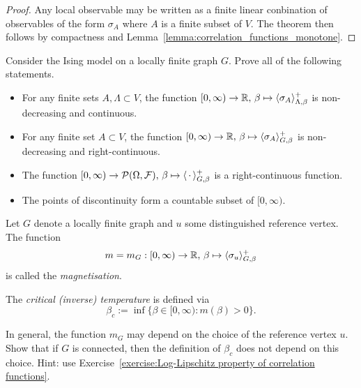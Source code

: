 \begin{proof}
    Any local observable may be written as a finite linear conbination
    of observables of the form $\sigma_A$ where $A$ is a finite subset of
    $V$.
    The theorem then follows by compactness and Lemma~\ref{lemma:correlation_functions_monotone}.
\end{proof}

\begin{exercise}
    Consider the Ising model on a locally finite graph $G$.
    Prove all of the following statements.
    \begin{itemize}
        \item For any finite sets $A,\Lambda\subset V$,
        the function $[0,\infty)\to\mathbb R,\,\beta\mapsto\langle\sigma_A\rangle_{\Lambda,\beta}^+$
        is non-decreasing and continuous.
        \item For any finite set $A\subset V$,
        the function $[0,\infty)\to\mathbb R,\,\beta\mapsto\langle\sigma_A\rangle_{G,\beta}^+$
        is non-decreasing and right-continuous.
        \item The function $[0,\infty)\to\mathcal P(\Omega,\mathcal F),\,\beta\mapsto\langle\,\cdot\,\rangle_{G,\beta}^+$
        is a right-continuous function.
        \item The points of discontinuity form a countable subset of $[0,\infty)$.
    \end{itemize}
\end{exercise}

\begin{definition}
    Let $G$ denote a locally finite graph and $u$ some distinguished reference vertex.
    The function
    \[
        m=m_G:[0,\infty)\to\mathbb R,\,\beta\mapsto\langle\sigma_u\rangle_{G,\beta}^+
    \]
    is called the \emph{magnetisation}.

    The \emph{critical (inverse) temperature} is defined via
    \[
        \beta_c:=\inf\{\beta\in[0,\infty):m(\beta)>0\}.
    \]
\end{definition}

\begin{exercise}
    \label{exercise:Definition of critical beta does not depend on ref point}
    In general, the function $m_G$ may depend on the choice of the reference vertex $u$.
    Show that if $G$ is connected, then the definition of $\beta_c$ does not depend on 
    this choice. Hint: use Exercise~\ref{exercise:Log-Lipschitz property of correlation functions}.
\end{exercise}

